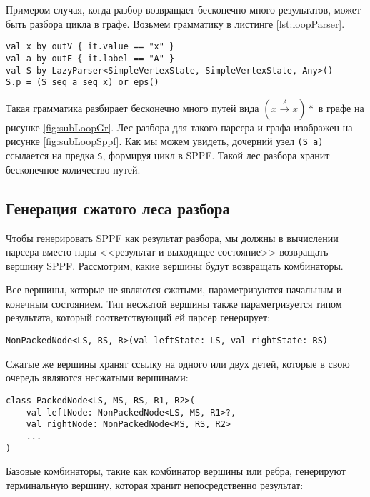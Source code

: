 Примером случая, когда разбор возвращает бесконечно много результатов, может быть разбора цикла в графе. Возьмем грамматику в листинге \ref{lst:loopParser}.

\begin{lstlisting}[float=h, label={lst:loopParser}, caption=Пример парсера графа с циклом]
val x by outV { it.value == "x" }
val a by outE { it.label == "A" }
val S by LazyParser<SimpleVertexState, SimpleVertexState, Any>()
S.p = (S seq a seq x) or eps()
\end{lstlisting}

Такая грамматика разбирает бесконечно много путей вида $(x \xrightarrow{A} x)*$ в графе на рисунке \ref{fig:subLoopGr}. Лес разбора для такого парсера и графа изображен на рисунке \ref{fig:subLoopSppf}. Как мы можем увидеть, дочерний узел \texttt{(S a)} ссылается на предка \texttt{S}, формируя цикл в SPPF. Такой лес разбора хранит бесконечное количество путей.

\subsection{Генерация сжатого леса разбора}

Чтобы генерировать SPPF как результат разбора, мы должны в вычислении парсера вместо пары <<результат и выходящее состояние>> возвращать вершину SPPF. Рассмотрим, какие вершины будут возвращать комбинаторы.

Все вершины, которые не являются сжатыми, параметризуются начальным и конечным состоянием. Тип несжатой вершины также параметризуется типом результата, который соответствующий ей парсер генерирует:
\begin{lstlisting}
NonPackedNode<LS, RS, R>(val leftState: LS, val rightState: RS)
\end{lstlisting}

Сжатые же вершины хранят ссылку на одного или двух детей, которые в свою очередь являются несжатыми вершинами:

\begin{nobreaks}
    \begin{lstlisting}
class PackedNode<LS, MS, RS, R1, R2>(
    val leftNode: NonPackedNode<LS, MS, R1>?,
    val rightNode: NonPackedNode<MS, RS, R2>
    ...
)
\end{lstlisting}
\end{nobreaks}

Базовые комбинаторы, такие как комбинатор вершины или ребра, генерируют терминальную вершину, которая хранит непосредственно результат: 

